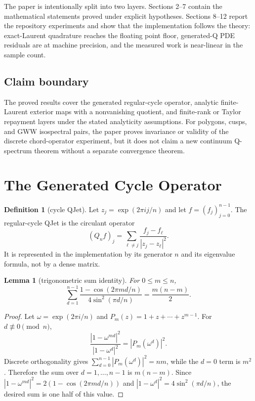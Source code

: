 \documentclass[10pt,leqno]{article}
\numberwithin{equation}{section}
\theoremstyle{plain}
\newtheorem{lemma}[theorem]{Lemma}
\theoremstyle{definition}
\newtheorem{definition}[theorem]{Definition}
\theoremstyle{remark}
\newcommand{\Qop}{Q}
\begin{document}
The paper is intentionally split into two layers.  Sections 2--7 contain the mathematical statements proved under explicit hypotheses.  Sections 8--12 report the repository experiments and show that the implementation follows the theory: exact-Laurent quadrature reaches the floating point floor, generated-Q PDE residuals are at machine precision, and the measured work is near-linear in the sample count.

\subsection{Claim boundary}
The proved results cover the generated regular-cycle operator, analytic finite-Laurent exterior maps with a nonvanishing quotient, and finite-rank or Taylor repayment layers under the stated analyticity assumptions.  For polygons, cusps, and GWW isospectral pairs, the paper proves invariance or validity of the discrete chord-operator experiment, but it does not claim a new continuum Q-spectrum theorem without a separate convergence theorem.
\section{The Generated Cycle Operator}
\begin{definition}[cycle QJet]
Let $z_j=\exp(2\pi i j/n)$ and let $f=(f_j)_{j=0}^{n-1}$.  The regular-cycle QJet is the circulant operator
\begin{equation}
(\Qop_n f)_j=\sum_{\ell\ne j}\frac{f_j-f_\ell}{|z_j-z_\ell|^2}.
\end{equation}
It is represented in the implementation by its generator $n$ and its eigenvalue formula, not by a dense matrix.
\end{definition}

\begin{lemma}[trigonometric sum identity]\label{lem:cycle-sum}
For $0\le m\le n$,
\begin{equation}
\sum_{d=1}^{n-1}\frac{1-\cos(2\pi m d/n)}{4\sin^2(\pi d/n)}
=\frac{m(n-m)}{2}.
\end{equation}
\end{lemma}
\begin{proof}
Let $\omega=\exp(2\pi i/n)$ and $P_m(z)=1+z+\cdots+z^{m-1}$.  For $d\not\equiv0\pmod n$,
\[
\frac{|1-\omega^{md}|^2}{|1-\omega^d|^2}=|P_m(\omega^d)|^2.
\]
Discrete orthogonality gives $\sum_{d=0}^{n-1}|P_m(\omega^d)|^2=nm$, while the $d=0$ term is $m^2$.  Therefore the sum over $d=1,\ldots,n-1$ is $m(n-m)$.  Since $|1-\omega^{md}|^2=2(1-\cos(2\pi md/n))$ and $|1-\omega^d|^2=4\sin^2(\pi d/n)$, the desired sum is one half of this value.
\end{proof}
\end{document}
